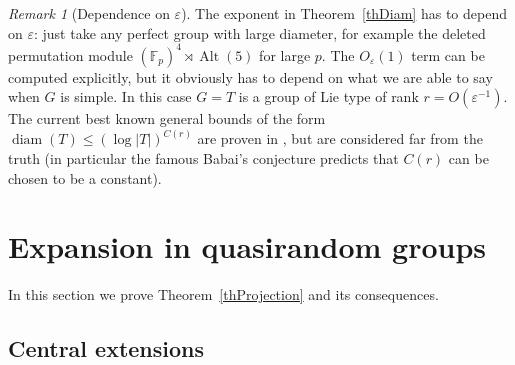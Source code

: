 \documentclass[11pt,reqno]{amsart}
\numberwithin{equation}{section}
\theoremstyle{definition}
\theoremstyle{remark}
\newtheorem{remark}[theorem]{Remark}
\newcommand{\Alt}{\mathop{\mathrm{Alt}}}
\newcommand{\diam}{\mathop{\mathrm{diam}}}
\begin{document}
\begin{remark}[Dependence on $\varepsilon$]
The exponent in Theorem~\ref{thDiam} has to depend on $\varepsilon$:
just take any perfect group with large diameter,
for example the deleted permutation module $(\mathbb{F}_p)^4 \rtimes \Alt(5)$ for large $p$.
The $O_\varepsilon(1)$ term can be computed explicitly,
but it obviously has to depend on what we are able to say when $G$ is simple.
In this case $G=T$ is a group of Lie type of rank $r=O(\varepsilon^{-1})$.
The current best known general bounds of the form $\diam(T) \leq (\log|T|)^{C(r)}$
are proven in \cite{HMPQ19}, but are considered far from the truth
(in particular the famous Babai's conjecture \cite{BS92} predicts that $C(r)$ can be chosen to be a constant).
\end{remark}























\vspace{0.1cm} 
\section{Expansion in quasirandom groups} \label{secExp}

In this section we prove Theorem~\ref{thProjection} and its consequences.

\subsection{Central extensions} 
\end{document}
